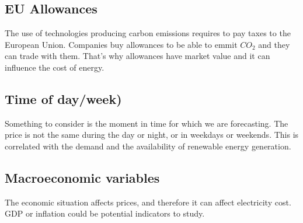\subsection{EU Allowances} The use of technologies producing carbon emissions requires to pay taxes to the European Union. Companies buy allowances to be able to emmit $CO_2$ and they can trade with them. That's why allowances have market value and it can influence the cost of energy.

\subsection{Time of day/week)} Something to consider is the moment in time for which we are forecasting. The price is not the same during the day or night, or in weekdays or weekends. This is correlated with the demand and the availability of renewable energy generation.

\subsection{Macroeconomic variables} The economic situation affects prices, and therefore it can affect electricity cost. GDP or inflation could be potential indicators to study.
